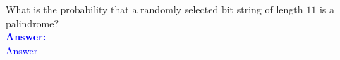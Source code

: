 \item{}
What is the probability that a randomly selected bit string of length $11$ is a
palindrome?\\[12pt]
\ifanswers
\textcolor{blue}{
\textbf{Answer:}\\[6pt]
Answer
}
\newpage
\fi
